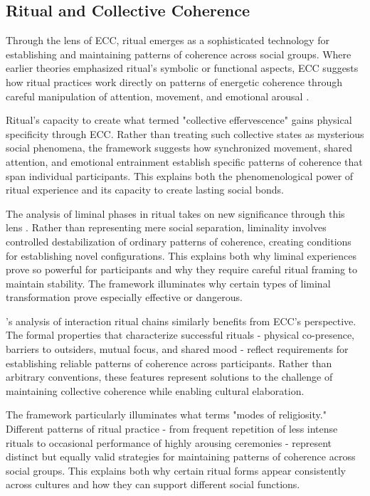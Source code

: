 \subsection{Ritual and Collective Coherence}

Through the lens of ECC, ritual emerges as a sophisticated technology for establishing and maintaining patterns of coherence across social groups. Where earlier theories emphasized ritual's symbolic or functional aspects, ECC suggests how ritual practices work directly on patterns of energetic coherence through careful manipulation of attention, movement, and emotional arousal \cite{turner1969ritual,rappaport1999ritual}.

Ritual's capacity to create what \cite{durkheim1995elementary} termed "collective effervescence" gains physical specificity through ECC. Rather than treating such collective states as mysterious social phenomena, the framework suggests how synchronized movement, shared attention, and emotional entrainment establish specific patterns of coherence that span individual participants. This explains both the phenomenological power of ritual experience and its capacity to create lasting social bonds.

The analysis of liminal phases in ritual takes on new significance through this lens \cite{turner1969ritual}. Rather than representing mere social separation, liminality involves controlled destabilization of ordinary patterns of coherence, creating conditions for establishing novel configurations. This explains both why liminal experiences prove so powerful for participants and why they require careful ritual framing to maintain stability. The framework illuminates why certain types of liminal transformation prove especially effective or dangerous.

\cite{collins2004interaction}'s analysis of interaction ritual chains similarly benefits from ECC's perspective. The formal properties that characterize successful rituals - physical co-presence, barriers to outsiders, mutual focus, and shared mood - reflect requirements for establishing reliable patterns of coherence across participants. Rather than arbitrary conventions, these features represent solutions to the challenge of maintaining collective coherence while enabling cultural elaboration.

The framework particularly illuminates what \cite{whitehouse2004modes} terms "modes of religiosity." Different patterns of ritual practice - from frequent repetition of less intense rituals to occasional performance of highly arousing ceremonies - represent distinct but equally valid strategies for maintaining patterns of coherence across social groups. This explains both why certain ritual forms appear consistently across cultures and how they can support different social functions.

